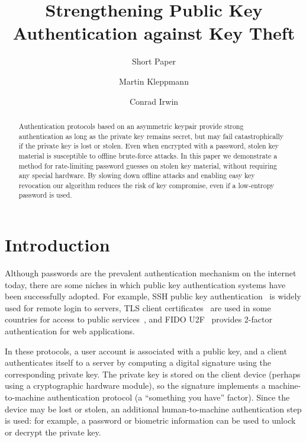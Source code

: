 \documentclass{llncs}
\begin{document}
\title{Strengthening Public Key Authentication against Key Theft}
\subtitle{Short Paper}
\author{Martin Kleppmann \and Conrad Irwin}
\maketitle

\begin{abstract}
Authentication protocols based on an asymmetric keypair provide strong authentication as long as the
private key remains secret, but may fail catastrophically if the private key is lost or stolen. Even
when encrypted with a password, stolen key material is susceptible to offline brute-force attacks.
In this paper we demonstrate a method for rate-limiting password guesses on stolen key material,
without requiring any special hardware. By slowing down offline attacks and enabling easy key
revocation our algorithm reduces the risk of key compromise, even if a low-entropy password is used.
\end{abstract}

\section{Introduction}\label{sec:intro}

Although passwords are the prevalent authentication mechanism on the internet today, there are some
niches in which public key authentication systems have been successfully adopted. For example, SSH
public key authentication~\cite{SSH} is widely used for remote login to servers, TLS client
certificates~\cite{TLS} are used in some countries for access to public services~\cite{Parsovs14},
and FIDO U2F~\cite{FIDOOverview} provides 2-factor authentication for web applications.

In these protocols, a user account is associated with a public key, and a client authenticates
itself to a server by computing a digital signature using the corresponding private key. The private
key is stored on the client device (perhaps using a cryptographic hardware module), so the signature
implements a machine-to-machine authentication protocol (a ``something you have'' factor). Since the
device may be lost or stolen, an additional human-to-machine authentication step is used: for
example, a password or biometric information can be used to unlock or decrypt the private key.
\end{document}

